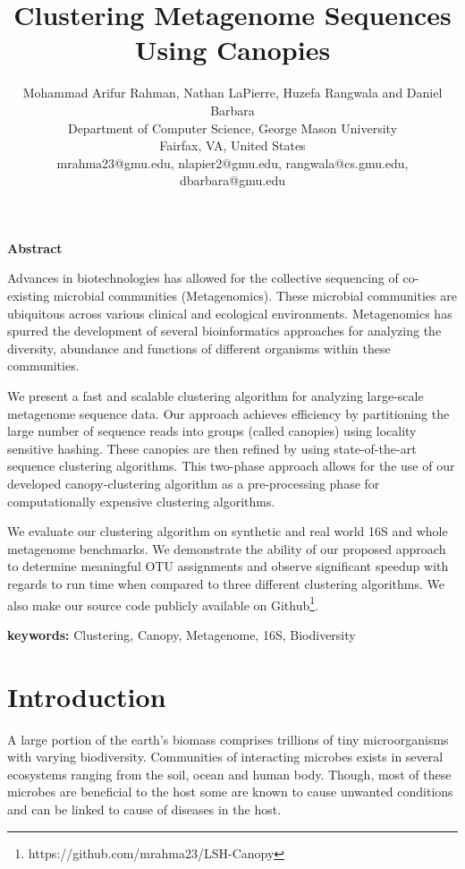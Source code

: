 \documentclass[letterpaper,twocolumn]{article}
\date{}
\begin{document}
\title{\Large\textbf{Clustering Metagenome Sequences Using Canopies}\normalsize}

\author {Mohammad Arifur Rahman, Nathan LaPierre, Huzefa Rangwala and Daniel Barbara\\
Department of Computer Science, George Mason University\\
Fairfax, VA, United States\\
mrahma23@gmu.edu, nlapier2@gmu.edu, rangwala@cs.gmu.edu, dbarbara@gmu.edu
}
\maketitle 
\thispagestyle{empty}
\begin{center}
\large\textbf{Abstract}
\end{center}
\vspace{2mm}
Advances in biotechnologies has allowed for the collective sequencing of co-existing microbial communities (Metagenomics). These microbial communities are ubiquitous across various clinical and ecological environments. Metagenomics has spurred the development of several bioinformatics approaches for analyzing the diversity, abundance and functions of different organisms within these communities.

We present a fast and scalable clustering algorithm for analyzing large-scale metagenome sequence data. Our approach achieves efficiency by partitioning the large number of sequence reads into groups (called canopies) using locality sensitive hashing. These canopies are then refined by using state-of-the-art sequence clustering algorithms. This two-phase approach allows for the use of our developed canopy-clustering algorithm as a pre-processing phase for computationally expensive clustering algorithms.

We evaluate our clustering algorithm on synthetic and real world 16S and whole metagenome  benchmarks. We demonstrate the ability of our proposed approach to  determine meaningful OTU assignments and observe significant speedup with regards to run time when compared to three different clustering algorithms. We also make our source code publicly available on Github\footnote{https://github.com/mrahma23/LSH-Canopy}. 

\medskip
\noindent
\textbf{keywords:} Clustering, Canopy, Metagenome, 16S, Biodiversity 

\section{Introduction} 
A large portion of the  earth's biomass 
comprises trillions of tiny  microorganisms 
with varying  biodiversity.  Communities
of interacting microbes  exists in several 
ecosystems ranging from the soil, ocean 
and human body\cite{MARHumanMicro}. Though, most of 
these microbes 
are beneficial to the host some are known to cause 
unwanted conditions and can be linked to cause of 
diseases in the host. 
\end{document}
